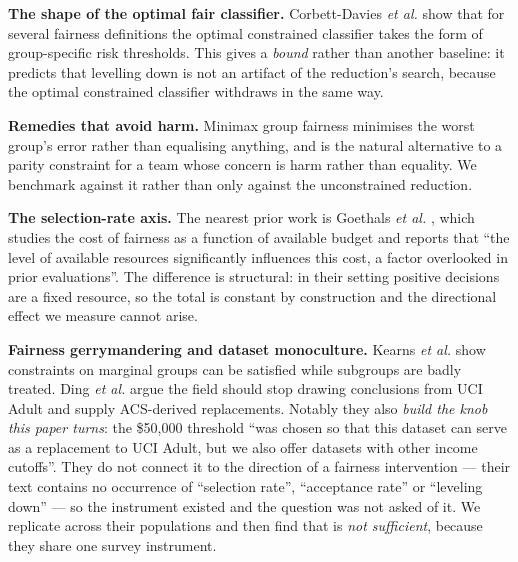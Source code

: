 \documentclass[9pt,conference]{IEEEtran}
\begin{document}
\textbf{The shape of the optimal fair classifier.} Corbett-Davies \emph{et al.}
\cite{corbett2017} show that for several fairness definitions the optimal constrained
classifier takes the form of group-specific risk thresholds. This gives a \emph{bound} rather
than another baseline: it predicts that levelling down is not an artifact of the reduction's
search, because the optimal constrained classifier withdraws in the same way.

\textbf{Remedies that avoid harm.} Minimax group fairness \cite{diana2021} minimises the worst
group's error rather than equalising anything, and is the natural alternative to a parity
constraint for a team whose concern is harm rather than equality. We benchmark against it
rather than only against the unconstrained reduction.

\textbf{The selection-rate axis.} The nearest prior work is Goethals \emph{et al.}
\cite{goethals2024}, which studies the cost of fairness as a function of available budget and
reports that ``the level of available resources significantly influences this cost, a factor
overlooked in prior evaluations''. The difference is structural: in their setting positive
decisions are a fixed resource, so the total is constant by construction and the directional
effect we measure cannot arise.

\textbf{Fairness gerrymandering and dataset monoculture.} Kearns \emph{et al.}
\cite{kearns2018} show constraints on marginal groups can be satisfied while subgroups are
badly treated. Ding \emph{et al.} \cite{ding2021} argue the field should stop drawing
conclusions from UCI Adult and supply ACS-derived replacements. Notably they also
\emph{build the knob this paper turns}: the \$50{,}000 threshold ``was chosen so that this
dataset can serve as a replacement to UCI Adult, but we also offer datasets with other income
cutoffs''. They do not connect it to the direction of a fairness intervention --- their text
contains no occurrence of ``selection rate'', ``acceptance rate'' or ``leveling down'' --- so
the instrument existed and the question was not asked of it. We replicate across their
populations and then find that is \emph{not sufficient}, because they share one survey
instrument.
\end{document}
